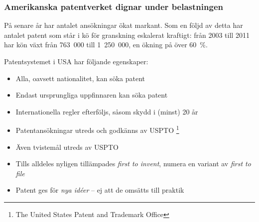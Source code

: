 \subsubsection{Amerikanska patentverket dignar under belastningen}

På senare år har antalet ansökningar ökat markant. Som en följd av detta har antalet patent som står i kö för granskning eskalerat kraftigt: från 2003 till 2011 har kön växt från 763~000 till 1~250~000, en ökning på över 60~\%.

Patentsystemet i USA har följande egenskaper:

\begin{itemize}
    \item{Alla, oavsett nationalitet, kan söka patent}
    \item{Endast ursprungliga uppfinnaren kan söka patent}
    \item{Internationella regler efterföljs, såsom skydd i (minst) 20 år}
    \item{Patentansökningar utreds och godkänns av USPTO \footnote{The United States Patent and Trademark Office}}
    \item{Även tvistemål utreds av USPTO}
    \item{Tills alldeles nyligen tillämpades \emph{first to invent}, numera en variant av \emph{first to file}}
    \item{Patent ges för \emph{nya idéer} -- ej att de omsätts till praktik}
\end{itemize}
